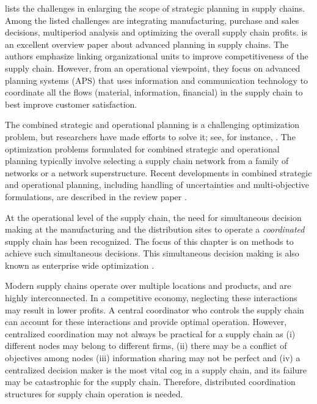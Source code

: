 \citet{shapiro:2004} lists the challenges in enlarging the scope of
strategic planning in supply chains. Among the listed challenges are
integrating manufacturing, purchase and sales decisions, multiperiod
analysis and optimizing the overall supply chain profits. \citet{
stadtler:2005} is an excellent overview paper about advanced planning
in supply chains. The authors emphasize  linking
organizational units to improve competitiveness of the supply
chain. However, from an operational viewpoint, they focus on advanced
planning systems (APS) that uses  information and
communication technology to coordinate all the flows (material,
information, financial) in the supply chain to best improve customer
satisfaction.

The combined strategic and operational planning is a challenging
optimization problem, but researchers have made efforts to solve it;
see, for instance,
\citep{sabri:beamon:2000,tsiakis:shah:pantelides:2001,you:grossmann:2008}. 
The optimization problems formulated for combined strategic and
operational planning typically involve selecting a supply chain
network from a family of networks or a network
superstructure. Recent developments in combined strategic and
operational planning, including handling of uncertainties and
multi-objective formulations, are described in the review paper
\citep{papageorgiou:2009}.  

At the operational level of the supply chain, the need for
simultaneous decision making  at the manufacturing and the
distribution sites to operate a \textit{coordinated} supply chain has
been recognized. The focus of this chapter is on methods to achieve such
simultaneous decisions. This simultaneous decision making is also
known as enterprise wide optimization \citep{grossmann:2005}.

Modern supply chains operate over multiple locations and products, and
are highly interconnected. In a competitive economy, neglecting these
interactions may result in lower profits. A central coordinator who
controls the supply chain can account for these interactions and
provide optimal operation. However, centralized coordination may not
always be practical for a supply chain as (i) different nodes may
belong to different firms, (ii) there may be a conflict of objectives
among nodes (iii) information sharing may not be  perfect and (iv) a
centralized decision maker is the most vital cog in a supply
chain, and its failure may be catastrophic for the supply
chain. Therefore, distributed coordination structures for supply chain
operation is needed.

